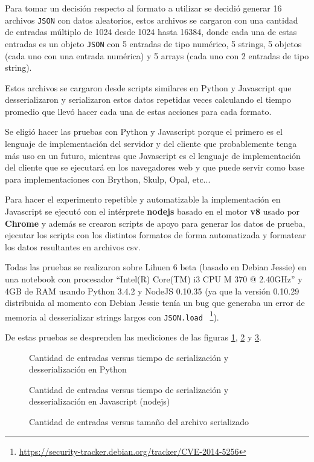 Para tomar un decisión respecto al formato a utilizar se decidió generar
16 archivos \texttt{JSON} con datos aleatorios, estos archivos se cargaron
con una cantidad de entradas múltiplo de 1024 desde 1024 hasta 16384, donde
cada una de estas entradas es un objeto \texttt{JSON} con 5 entradas de tipo
numérico, 5 strings, 5 objetos (cada uno con una entrada numérica) y 5
arrays (cada uno con 2 entradas de tipo string).

Estos archivos se cargaron desde scripts similares en Python y Javascript que
desserializaron y serializaron estos datos repetidas veces calculando el tiempo
promedio que llevó hacer cada una de estas acciones para cada formato.

Se eligió hacer las pruebas con Python y Javascript porque el primero es el
lenguaje de implementación del servidor y del cliente que probablemente tenga
más uso en un futuro, mientras que Javascript es el lenguaje de implementación
del cliente que se ejecutará en los navegadores web y que puede servir como
base para implementaciones con Brython, Skulp, Opal, etc...

Para hacer el experimento repetible y automatizable la implementación en
Javascript se ejecutó con el intérprete \textbf{nodejs} basado en
el motor \textbf{v8} usado por \textbf{Chrome} y además se crearon
scripts de apoyo para generar los datos de prueba, ejecutar los scripts
con los distintos formatos de forma automatizada y formatear los datos
resultantes en archivos csv.

Todas las pruebas se realizaron sobre Lihuen 6 beta (basado en Debian Jessie)
en una notebook con procesador ``Intel(R) Core(TM) i3 CPU M 370 @ 2.40GHz''
y 4GB de RAM %
usando Python 3.4.2 y NodeJS 0.10.35 (ya que la versión 0.10.29 distribuida al
momento con Debian Jessie tenía un bug que generaba un error de memoria al
desserializar strings largos con \texttt{JSON.load}~%
\footnote{\url{https://security-tracker.debian.org/tracker/CVE-2014-5256}}).

De estas pruebas se desprenden las mediciones de las figuras%
\ref{fig:ser-time-py}, \ref{fig:ser-time-js} y \ref{fig:ser-size}.

\begin{figure}

    \caption{Cantidad de entradas versus tiempo de serialización y desserialización en Python}
    \label{fig:ser-time-py}
\end{figure}

\begin{figure}

    \caption{Cantidad de entradas versus tiempo de serialización y desserialización en Javascript (nodejs)}
    \label{fig:ser-time-js}
\end{figure}

\begin{figure}

    \caption{Cantidad de entradas versus tamaño del archivo serializado}
    \label{fig:ser-size}
\end{figure}

